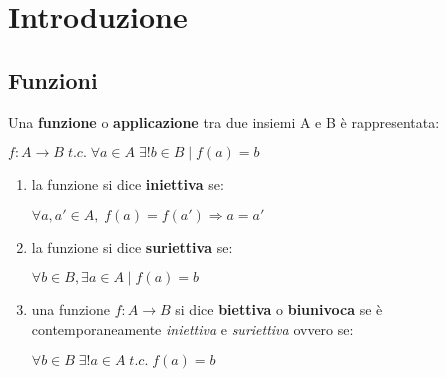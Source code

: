 \chapter{Introduzione}

\section{Funzioni}
Una \textbf{funzione} o \textbf{applicazione} tra due insiemi A e B è rappresentata:
\begin{center}
    $f : A \rightarrow B \; t.c. \; \forall a \in A \; \exists ! b \in B \; | \; f(a) = b$
\end{center}
\begin{enumerate}
    \item la funzione si dice \textbf{iniettiva} se:
        \begin{center}
            $\forall a, a' \in A, \; f(a) = f(a') \Rightarrow a = a'$
        \end{center}
    \item la funzione si dice \textbf{suriettiva} se:
        \begin{center}
            $\forall b \in B, \exists a \in A \; | \; f(a) = b$    
        \end{center}
    \item una funzione $f : A \rightarrow B$ si dice \textbf{biettiva} o \textbf{biunivoca} se è contemporaneamente \textit{iniettiva} e \textit{suriettiva} ovvero se:
        \begin{center}
            $\forall b \in B \; \exists ! a \in A \; t.c. \; f(a) = b $
        \end{center}
\end{enumerate}

\newpage
